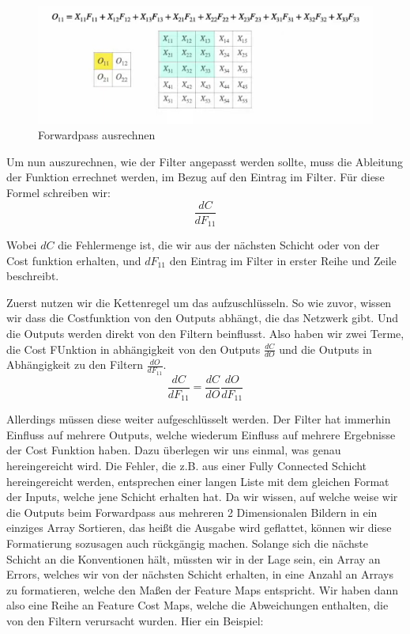 \documentclass[12pt]{article}
\begin{document}

\begin{figure}[H]
\centering
\includegraphics[scale=0.50]{./Images/TemporaryPlaceholders/Bildschirmfoto vom 2024-05-20 15-40-51.png}
\caption{Forwardpass ausrechnen}
\label{Forwardpass ausrechnen}
\end{figure}

Um nun auszurechnen, wie der Filter angepasst werden sollte, muss die Ableitung der Funktion errechnet werden, im Bezug auf den Eintrag im Filter. Für diese Formel schreiben wir:
$$\frac{dC}{dF_{11}}$$

Wobei $dC$ die Fehlermenge ist, die wir aus der nächsten Schicht oder von der Cost funktion erhalten, und $dF_{11}$ den Eintrag im Filter in erster Reihe und Zeile beschreibt.

Zuerst nutzen wir die Kettenregel um das aufzuschlüsseln. So wie zuvor, wissen wir dass die Costfunktion von den Outputs abhängt, die das Netzwerk gibt. Und die Outputs werden direkt von den Filtern beinflusst. Also haben wir zwei Terme, die Cost FUnktion in abhängigkeit von den Outputs $\frac{dC} {dO} $ und die Outputs in Abhängigkeit zu den Filtern $ \frac{dO} {dF_{11}}$.
$$\frac{dC}{dF_{11}} = \frac{dC} {dO} \frac{dO} {dF_{11}}$$

Allerdings müssen diese weiter aufgeschlüsselt werden. Der Filter hat immerhin Einfluss auf mehrere Outputs, welche wiederum Einfluss auf mehrere Ergebnisse der Cost Funktion haben. Dazu überlegen wir uns einmal, was genau hereingereicht wird. Die Fehler, die z.B. aus einer Fully Connected Schicht hereingereicht werden, entsprechen einer langen Liste mit dem gleichen Format der Inputs, welche jene Schicht erhalten hat. Da wir wissen, auf welche weise wir die Outputs beim Forwardpass aus mehreren 2 Dimensionalen Bildern in ein einziges Array Sortieren, das heißt die Ausgabe wird geflattet, können wir diese Formatierung sozusagen auch rückgängig machen. Solange sich die nächste Schicht an die Konventionen hält, müssten wir in der Lage sein, ein Array an Errors, welches wir von der nächsten Schicht erhalten, in eine Anzahl an Arrays zu formatieren, welche den Maßen der Feature Maps entspricht.
Wir haben dann also eine Reihe an Feature Cost Maps, welche die Abweichungen enthalten, die von den Filtern verursacht wurden. Hier ein Beispiel:
\end{document}
